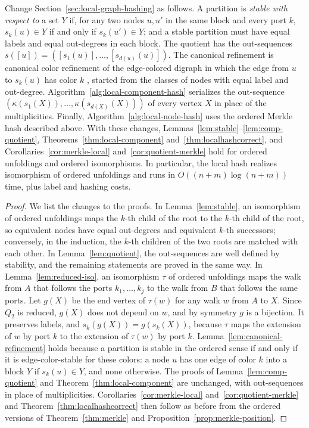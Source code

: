 \documentclass[twoside,leqno]{article}
\begin{document}
\begin{theorem}
\label{thm:ordered-local}
Change Section~\ref{sec:local-graph-hashing} as follows. A partition is \emph{stable with respect to} a set $Y$ if, for any two nodes $u,u'$ in the same block and every port $k$, $s_k(u)\in Y$ if and only if $s_k(u')\in Y$; and a stable partition must have equal labels and equal out-degrees in each block. The quotient has the out-sequences $s([u])=([s_1(u)],\dots,[s_{d(u)}(u)])$. The canonical refinement is canonical color refinement of the edge-colored digraph in which the edge from $u$ to $s_k(u)$ has color $k$ \cite{berkholz2017tight}, started from the classes of nodes with equal label and out-degree. Algorithm~\ref{alg:local-component-hash} serializes the out-sequence $(\kappa(s_1(X)),\dots,\kappa(s_{d(X)}(X)))$ of every vertex $X$ in place of the multiplicities. Finally, Algorithm~\ref{alg:local-node-hash} uses the ordered Merkle hash described above. With these changes, Lemmas~\ref{lem:stable}--\ref{lem:comp-quotient}, Theorems~\ref{thm:local-component} and~\ref{thm:localhashcorrect}, and Corollaries~\ref{cor:merkle-local} and~\ref{cor:quotient-merkle} hold for ordered unfoldings and ordered isomorphisms. In particular, the local hash realizes isomorphism of ordered unfoldings and runs in $O((n+m)\log(n+m))$ time, plus label and hashing costs.
\end{theorem}
\begin{proof}
We list the changes to the proofs. In Lemma~\ref{lem:stable}, an isomorphism of ordered unfoldings maps the $k$-th child of the root to the $k$-th child of the root, so equivalent nodes have equal out-degrees and equivalent $k$-th successors; conversely, in the induction, the $k$-th children of the two roots are matched with each other. In Lemma~\ref{lem:quotient}, the out-sequences are well defined by stability, and the remaining statements are proved in the same way. In Lemma~\ref{lem:reduced-iso}, an isomorphism $\tau$ of ordered unfoldings maps the walk from $A$ that follows the ports $k_1,\dots,k_j$ to the walk from $B$ that follows the same ports. Let $g(X)$ be the end vertex of $\tau(w)$ for any walk $w$ from $A$ to $X$. Since $Q_2$ is reduced, $g(X)$ does not depend on $w$, and by symmetry $g$ is a bijection. It preserves labels, and $s_k(g(X))=g(s_k(X))$, because $\tau$ maps the extension of $w$ by port $k$ to the extension of $\tau(w)$ by port $k$. Lemma~\ref{lem:canonical-refinement} holds because a partition is stable in the ordered sense if and only if it is edge-color-stable for these colors: a node $u$ has one edge of color $k$ into a block $Y$ if $s_k(u)\in Y$, and none otherwise. The proofs of Lemma~\ref{lem:comp-quotient} and Theorem~\ref{thm:local-component} are unchanged, with out-sequences in place of multiplicities. Corollaries~\ref{cor:merkle-local} and~\ref{cor:quotient-merkle} and Theorem~\ref{thm:localhashcorrect} then follow as before from the ordered versions of Theorem~\ref{thm:merkle} and Proposition~\ref{prop:merkle-position}.
\end{proof}
\end{document}
